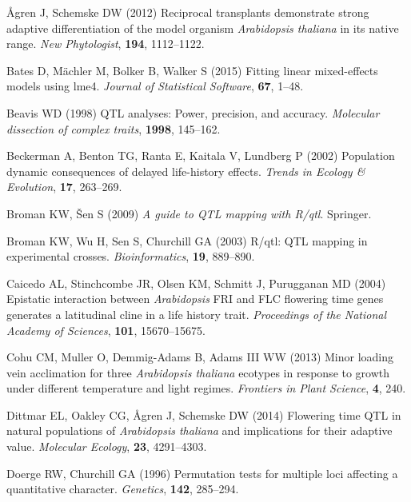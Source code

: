 \documentclass[]{article}
\begin{document}
\leavevmode\hypertarget{ref-agren_reciprocal_2012}{}%
Ågren J, Schemske DW (2012) Reciprocal transplants demonstrate strong adaptive differentiation of the model organism \emph{Arabidopsis thaliana} in its native range. \emph{New Phytologist}, \textbf{194}, 1112--1122.

\leavevmode\hypertarget{ref-bates2015}{}%
Bates D, Mächler M, Bolker B, Walker S (2015) Fitting linear mixed-effects models using lme4. \emph{Journal of Statistical Software}, \textbf{67}, 1--48.

\leavevmode\hypertarget{ref-beavis1998qtl}{}%
Beavis WD (1998) QTL analyses: Power, precision, and accuracy. \emph{Molecular dissection of complex traits}, \textbf{1998}, 145--162.

\leavevmode\hypertarget{ref-beckerman2002population}{}%
Beckerman A, Benton TG, Ranta E, Kaitala V, Lundberg P (2002) Population dynamic consequences of delayed life-history effects. \emph{Trends in Ecology \& Evolution}, \textbf{17}, 263--269.

\leavevmode\hypertarget{ref-Broman2009}{}%
Broman KW, Šen S (2009) \emph{A guide to QTL mapping with R/qtl}. Springer.

\leavevmode\hypertarget{ref-Broman2003}{}%
Broman KW, Wu H, Sen S, Churchill GA (2003) R/qtl: QTL mapping in experimental crosses. \emph{Bioinformatics}, \textbf{19}, 889--890.

\leavevmode\hypertarget{ref-caicedo2004epistatic}{}%
Caicedo AL, Stinchcombe JR, Olsen KM, Schmitt J, Purugganan MD (2004) Epistatic interaction between \emph{Arabidopsis} FRI and FLC flowering time genes generates a latitudinal cline in a life history trait. \emph{Proceedings of the National Academy of Sciences}, \textbf{101}, 15670--15675.

\leavevmode\hypertarget{ref-cohu2013minor}{}%
Cohu CM, Muller O, Demmig-Adams B, Adams III WW (2013) Minor loading vein acclimation for three \emph{Arabidopsis thaliana} ecotypes in response to growth under different temperature and light regimes. \emph{Frontiers in Plant Science}, \textbf{4}, 240.

\leavevmode\hypertarget{ref-dittmar2014flowering}{}%
Dittmar EL, Oakley CG, Ågren J, Schemske DW (2014) Flowering time QTL in natural populations of \emph{Arabidopsis thaliana} and implications for their adaptive value. \emph{Molecular Ecology}, \textbf{23}, 4291--4303.

\leavevmode\hypertarget{ref-doerge1996permutation}{}%
Doerge RW, Churchill GA (1996) Permutation tests for multiple loci affecting a quantitative character. \emph{Genetics}, \textbf{142}, 285--294.
\end{document}
